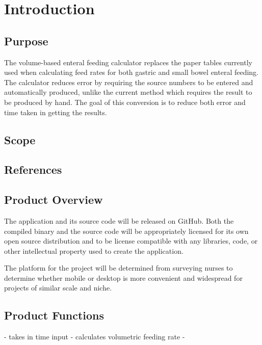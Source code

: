 \documentclass[10pt,draftclsnofoot,onecolumn]{IEEEtran}
\begin{document}
\title{}
\author{Alison Jones \& Parker Okonek}
\maketitle
\begin{abstract}
\end{abstract}
\newpage
\section{Introduction}

\subsection{Purpose}
The volume-based enteral feeding calculator replaces the paper tables currently used when 
calculating feed rates for both gastric and small bowel enteral feeding. The calculator reduces
error by requiring the source numbers to be entered and automatically produced, unlike the current
method which requires the result to be produced by hand. The goal of this conversion is to reduce both
error and time taken in getting the results.

\subsection{Scope}

\subsection{References}
\subsection{Product Overview}
The application and its source code will be released on GitHub. Both the compiled binary and the source code
will be appropriately licensed for its own open source distribution and to be license compatible with any 
libraries, code, or other intellectual property used to create the application.

The platform for the project will be determined from surveying nurses to determine whether mobile or desktop
is more convenient and widespread for projects of similar scale and niche.

\subsection{Product Functions}
- takes in time input
- calculates volumetric feeding rate
- 
\end{document}
